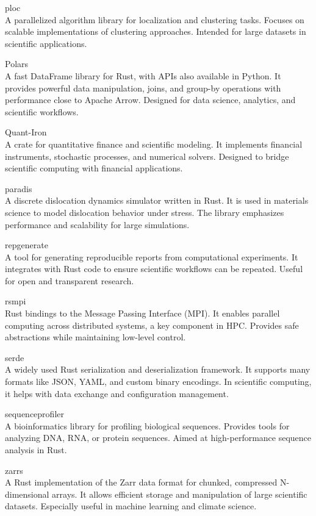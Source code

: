 \documentclass{article}
\begin{document}
ploc\\
A parallelized algorithm library for localization and clustering tasks. Focuses on scalable
implementations of clustering approaches. Intended for large datasets in scientific applications.

Polars\\
A fast DataFrame library for Rust, with APIs also available in Python. It provides
powerful data manipulation, joins, and group-by operations with performance close to Apache Arrow.
Designed for data science, analytics, and scientific workflows.

Quant-Iron\\
A crate for quantitative finance and scientific modeling. It implements financial
instruments, stochastic processes, and numerical solvers. Designed to bridge scientific computing
with financial applications.

paradis\\
A discrete dislocation dynamics simulator written in Rust. It is used in materials
science to model dislocation behavior under stress. The library emphasizes performance and
scalability for large simulations.

repgenerate\\
A tool for generating reproducible reports from computational experiments. It
integrates with Rust code to ensure scientific workflows can be repeated. Useful for open and
transparent research.

rsmpi\\
Rust bindings to the Message Passing Interface (MPI). It enables parallel computing across
distributed systems, a key component in HPC. Provides safe abstractions while maintaining low-level
control.

serde\\
A widely used Rust serialization and deserialization framework. It supports many formats
like JSON, YAML, and custom binary encodings. In scientific computing, it helps with data exchange
and configuration management.

sequenceprofiler\\
A bioinformatics library for profiling biological sequences. Provides tools for
analyzing DNA, RNA, or protein sequences. Aimed at high-performance sequence analysis in Rust.

zarrs\\
A Rust implementation of the Zarr data format for chunked, compressed N-dimensional arrays.
It allows efficient storage and manipulation of large scientific datasets. Especially useful in
machine learning and climate science.
\end{document}

